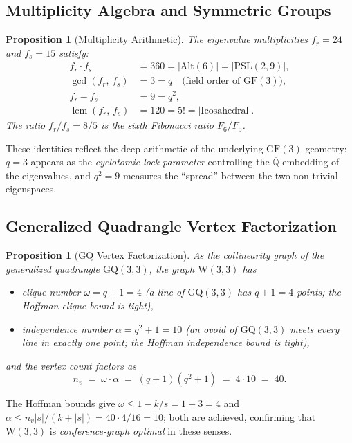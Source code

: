 \documentclass[12pt,a4paper]{article}
\newtheorem{proposition}[theorem]{Proposition}
\newcommand{\W}{\mathrm{W}(3,3)}
\newcommand{\nv}{n_{\!v}}
\newcommand{\fr}{f_{\!r}}
\newcommand{\fs}{f_{\!s}}
\newcommand{\GF}{\mathrm{GF}}
\newcommand{\Alt}{\mathrm{Alt}}
\DeclareMathOperator{\lcm}{lcm}
\begin{document}
\subsection{Multiplicity Algebra and Symmetric Groups}

\begin{proposition}[Multiplicity Arithmetic]
\label{prop:multarith}
The eigenvalue multiplicities $\fr = 24$ and $\fs = 15$ satisfy:
\begin{align}
  \fr\cdot\fs &= 360 = |\Alt(6)| = |\mathrm{PSL}(2,9)|,\\
  \gcd(\fr,\,\fs) &= 3 = q
  \quad\text{(field order of }\GF(3)\text{)},\\
  \fr - \fs  &= 9 = q^2,\\
  \lcm(\fr,\,\fs) &= 120 = 5! = |\mathrm{Icosahedral}|.
\end{align}
The ratio $\fr/\fs = 8/5$ is the sixth Fibonacci ratio $F_6/F_5$.
\end{proposition}

These identities reflect the deep arithmetic of the underlying
$\GF(3)$-geometry: $q=3$ appears as the \emph{cyclotomic lock
parameter} controlling the $\overline{\mathbb{Q}}$ embedding of
the eigenvalues, and $q^2=9$ measures the ``spread'' between the
two non-trivial eigenspaces.

\subsection{Generalized Quadrangle Vertex Factorization}

\begin{proposition}[GQ Vertex Factorization]
\label{prop:gqfactor}
As the collinearity graph of the generalized quadrangle $\mathrm{GQ}(3,3)$,
the graph $\W$ has
\begin{itemize}
  \item clique number $\omega = q+1 = 4$ (a \emph{line} of $\mathrm{GQ}(3,3)$
        has $q+1=4$ points; the Hoffman clique bound is tight),
  \item independence number $\alpha = q^2+1 = 10$ (an \emph{ovoid} of
        $\mathrm{GQ}(3,3)$ meets every line in exactly one point;
        the Hoffman independence bound is tight),
\end{itemize}
and the vertex count factors as
\[
  \nv \;=\; \omega\cdot\alpha \;=\; (q+1)(q^2+1) \;=\; 4\cdot 10 \;=\; 40.
\]
\end{proposition}

\noindent
The Hoffman bounds give $\omega \le 1-k/s = 1+3 = 4$ and
$\alpha \le \nv|s|/(k+|s|) = 40\cdot 4/16 = 10$; both are achieved,
confirming that $\W$ is \emph{conference-graph optimal} in these senses.
\end{document}

